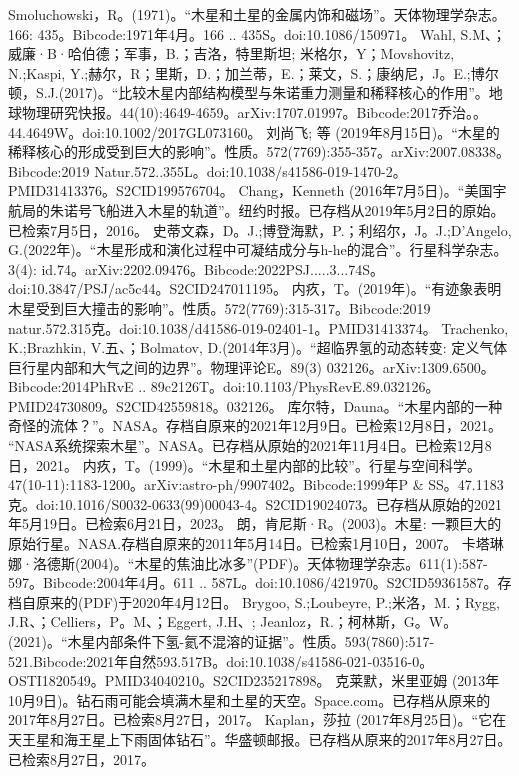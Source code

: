 \begin{enumerate}
 Smoluchowski，R。(1971)。“木星和土星的金属内饰和磁场”。天体物理学杂志。166: 435。Bibcode:1971年4月。166 .. 435S。doi:10.1086/150971。
 Wahl, S.M、；威廉·B·哈伯德；军事，B.；吉洛，特里斯坦; 米格尔，Y；Movshovitz, N.;Kaspi, Y.;赫尔，R；里斯，D.；加兰蒂，E.；莱文，S.；康纳尼，J。E.;博尔顿，S.J.(2017)。“比较木星内部结构模型与朱诺重力测量和稀释核心的作用”。地球物理研究快报。44(10):4649-4659。arXiv:1707.01997。Bibcode:2017乔治。。44.4649W。doi:10.1002/2017GL073160。
 刘尚飞; 等 (2019年8月15日)。“木星的稀释核心的形成受到巨大的影响”。性质。572(7769):355-357。arXiv:2007.08338。Bibcode:2019 Natur.572..355L。doi:10.1038/s41586-019-1470-2。PMID31413376。S2CID199576704。  
 Chang，Kenneth (2016年7月5日)。“美国宇航局的朱诺号飞船进入木星的轨道”。纽约时报。已存档从2019年5月2日的原始。已检索7月5日，2016。
 史蒂文森，D。J.;博登海默，P.；利绍尔，J。J.;D'Angelo, G.(2022年)。“木星形成和演化过程中可凝结成分与h-he的混合”。行星科学杂志。3(4): id.74。arXiv:2202.09476。Bibcode:2022PSJ.....3...74S。doi:10.3847/PSJ/ac5c44。S2CID247011195。 
 内疚，T。(2019年)。“有迹象表明木星受到巨大撞击的影响”。性质。572(7769):315-317。Bibcode:2019 natur.572.315克。doi:10.1038/d41586-019-02401-1。PMID31413374。 
 Trachenko, K.;Brazhkin, V.五、；Bolmatov, D.(2014年3月)。“超临界氢的动态转变: 定义气体巨行星内部和大气之间的边界”。物理评论E。89(3) 032126。arXiv:1309.6500。Bibcode:2014PhRvE .. 89c2126T。doi:10.1103/PhysRevE.89.032126。PMID24730809。S2CID42559818。032126。  
 库尔特，Dauna。“木星内部的一种奇怪的流体？”。NASA。存档自原来的2021年12月9日。已检索12月8日，2021。
 “NASA系统探索木星”。NASA。已存档从原始的2021年11月4日。已检索12月8日，2021。
 内疚，T。(1999)。“木星和土星内部的比较”。行星与空间科学。47(10-11):1183-1200。arXiv:astro-ph/9907402。Bibcode:1999年P & SS。47.1183克。doi:10.1016/S0032-0633(99)00043-4。S2CID19024073。已存档从原始的2021年5月19日。已检索6月21日，2023。 
 朗，肯尼斯·R。(2003)。木星: 一颗巨大的原始行星。NASA.存档自原来的2011年5月14日。已检索1月10日，2007。
 卡塔琳娜·洛德斯(2004)。“木星的焦油比冰多”(PDF)。天体物理学杂志。611(1):587-597。Bibcode:2004年4月。611 .. 587L。doi:10.1086/421970。S2CID59361587。存档自原来的(PDF)于2020年4月12日。  
 Brygoo, S.;Loubeyre, P.;米洛，M.；Rygg, J.R、；Celliers，P。M、；Eggert, J.H、; Jeanloz，R.；柯林斯，G。W。(2021)。“木星内部条件下氢-氦不混溶的证据”。性质。593(7860):517-521.Bibcode:2021年自然593.517B。doi:10.1038/s41586-021-03516-0。OSTI1820549。PMID34040210。S2CID235217898。   
 克莱默，米里亚姆 (2013年10月9日)。钻石雨可能会填满木星和土星的天空。Space.com。已存档从原来的2017年8月27日。已检索8月27日，2017。
 Kaplan，莎拉 (2017年8月25日)。“它在天王星和海王星上下雨固体钻石”。华盛顿邮报。已存档从原来的2017年8月27日。已检索8月27日，2017。

\end{enumerate}
